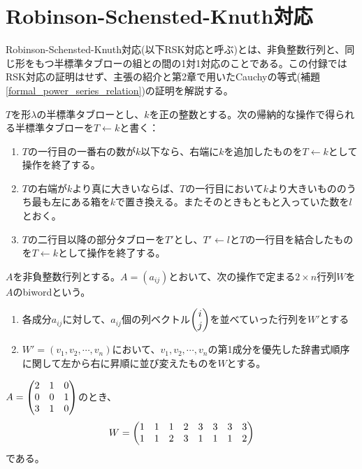 \documentclass{ltjsreport}
\begin{document}
\chapter{Robinson-Schensted-Knuth対応}

Robinson-Schensted-Knuth対応(以下RSK対応と呼ぶ)とは、非負整数行列と、同じ形をもつ半標準タブローの組との間の1対1対応のことである。この付録ではRSK対応の証明はせず、主張の紹介と第2章で用いたCauchyの等式(補題\ref{formal_power_series_relation})の証明を解説する。

\begin{defin}[行挿入]
  $T$を形$\lambda$の半標準タブローとし、$k$を正の整数とする。次の帰納的な操作で得られる半標準タブローを$T\leftarrow k$と書く：
  \begin{enumerate}
    \item $T$の一行目の一番右の数が$k$以下なら、右端に$k$を追加したものを$T\leftarrow k$として操作を終了する。
    \item $T$の右端が$k$より真に大きいならば、$T$の一行目において$k$より大きいもののうち最も左にある箱を$k$で置き換える。またそのときもともと入っていた数を$l$とおく。
    \item $T$の二行目以降の部分タブローを$T'$とし、$T'\leftarrow l$と$T$の一行目を結合したものを$T\leftarrow k$として操作を終了する。
  \end{enumerate}
\end{defin}

\begin{defin}
  $A$を非負整数行列とする。$A=(a_{ij})$とおいて、次の操作で定まる$2\times n$行列$W$を$A$のbiwordという。
  \begin{enumerate}
    \item 各成分$a_{ij}$に対して、$a_{ij}$個の列ベクトル$\begin{pmatrix} i\\j \end{pmatrix}$を並べていった行列を$W'$とする
    \item $W'=(v_1,v_2,\cdots,v_n)$において、$v_1,v_2,\cdots,v_n$の第1成分を優先した辞書式順序に関して左から右に昇順に並び変えたものを$W$とする。
  \end{enumerate}
\end{defin}

\begin{eg}
  $A=\begin{pmatrix} 2 & 1 & 0\\0 &0 &1\\3 &1 &0 \end{pmatrix}$のとき、
  \[
  W=\begin{pmatrix} 
    1 & 1 & 1 & 2 & 3 & 3 & 3 & 3\\
    1 & 1 & 2 & 3 & 1 & 1 & 1 & 2
   \end{pmatrix}
  \]
  である。
\end{eg}
\end{document}
